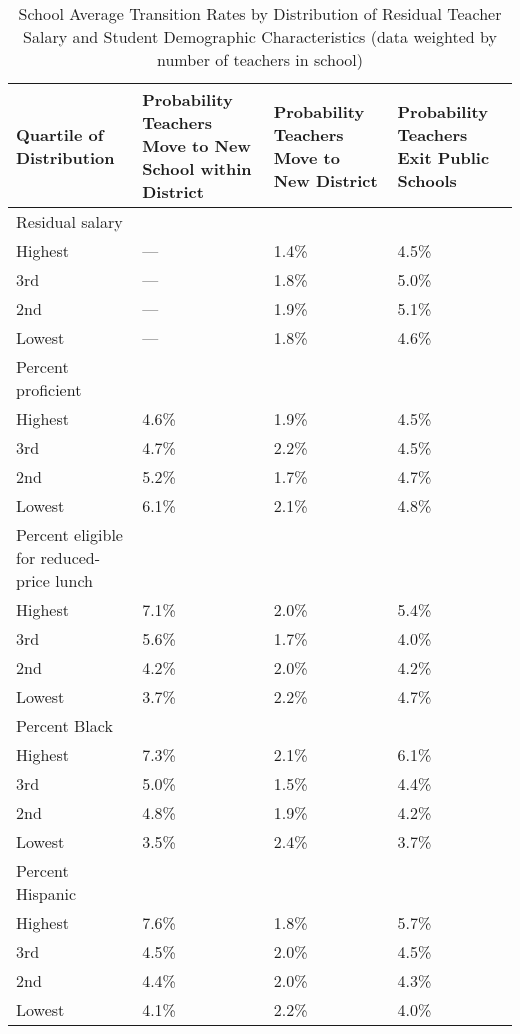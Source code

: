 \documentclass[12pt,]{article}
\begin{document}
\begin{table}[htbp]
\centering
\begin{tabular}{p{}p{}p{}p{}}
  \hline
Quartile of Distribution & Probability Teachers Move to New School within District & Probability Teachers Move to New District & Probability Teachers Exit Public Schools \\ 
  \hline
Residual salary & & & \\
\quad Highest & --- & 1.4\% & 4.5\% \\ 
  \quad 3rd & --- & 1.8\% & 5.0\% \\ 
  \quad 2nd & --- & 1.9\% & 5.1\% \\ 
  \quad Lowest & --- & 1.8\% & 4.6\% \\ 
Percent proficient & & & \\
  \quad Highest & 4.6\% & 1.9\% & 4.5\% \\ 
  \quad 3rd & 4.7\% & 2.2\% & 4.5\% \\ 
  \quad 2nd & 5.2\% & 1.7\% & 4.7\% \\ 
  \quad Lowest & 6.1\% & 2.1\% & 4.8\% \\ 
Percent eligible for reduced-price lunch & & & \\
  \quad Highest & 7.1\% & 2.0\% & 5.4\% \\ 
  \quad 3rd & 5.6\% & 1.7\% & 4.0\% \\ 
  \quad 2nd & 4.2\% & 2.0\% & 4.2\% \\ 
  \quad Lowest & 3.7\% & 2.2\% & 4.7\% \\ 
Percent Black & & & \\
  \quad Highest & 7.3\% & 2.1\% & 6.1\% \\ 
  \quad 3rd & 5.0\% & 1.5\% & 4.4\% \\ 
  \quad 2nd & 4.8\% & 1.9\% & 4.2\% \\ 
  \quad Lowest & 3.5\% & 2.4\% & 3.7\% \\ 
Percent Hispanic & & & \\
  \quad Highest & 7.6\% & 1.8\% & 5.7\% \\ 
  \quad 3rd & 4.5\% & 2.0\% & 4.5\% \\ 
  \quad 2nd & 4.4\% & 2.0\% & 4.3\% \\ 
  \quad Lowest & 4.1\% & 2.2\% & 4.0\% \\ 
   \hline
\end{tabular}
\caption{School Average Transition Rates by Distribution of Residual Teacher Salary and Student Demographic Characteristics (data weighted by number of teachers in school)} 
\label{tbl:change_by_quartile}
\end{table}
\end{document}
